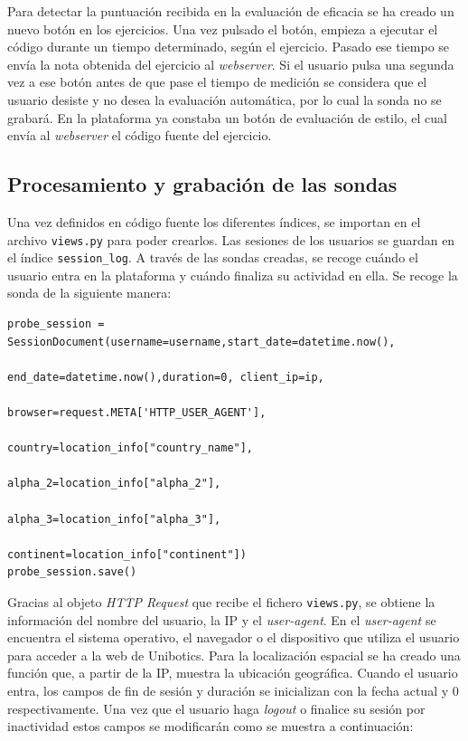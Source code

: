 Para detectar la puntuación recibida en la evaluación de eficacia se ha creado un nuevo botón en los ejercicios. Una vez pulsado el botón, empieza a ejecutar el código durante un tiempo determinado, según el ejercicio. Pasado ese tiempo se envía la nota obtenida del ejercicio al \textit{webserver}. Si el usuario pulsa una segunda vez a ese botón antes de que pase el tiempo de medición se considera que el usuario desiste y no desea la evaluación automática, por lo cual la sonda no se grabará. En la plataforma ya constaba un botón de evaluación de estilo, el cual envía al \textit{webserver} el código fuente del ejercicio.

\subsection{Procesamiento y grabación de las sondas}
Una vez definidos en código fuente los diferentes índices, se importan en el archivo \texttt{views.py} para poder crearlos. Las sesiones de los usuarios se guardan en el índice \texttt{session\_log}. A través de las sondas creadas, se recoge cuándo el usuario entra en la plataforma y cuándo finaliza su actividad en ella. Se recoge la sonda de la siguiente manera:
\\
\begin{lstlisting}
probe_session = SessionDocument(username=username,start_date=datetime.now(),
                                        end_date=datetime.now(),duration=0, client_ip=ip, 
                                        browser=request.META['HTTP_USER_AGENT'],
                                        country=location_info["country_name"],
                                        alpha_2=location_info["alpha_2"], 
                                        alpha_3=location_info["alpha_3"],
                                        continent=location_info["continent"])
probe_session.save()
\end{lstlisting}

Gracias al objeto \textit{HTTP Request} que recibe el fichero \texttt{views.py}, se obtiene la información del nombre del usuario, la IP y el \textit{user-agent}. En el \textit{user-agent} se encuentra el sistema operativo, el navegador o el dispositivo que utiliza el usuario para acceder a la web de Unibotics. Para la localización espacial se ha creado una función que, a partir de la IP, muestra la ubicación geográfica. Cuando el usuario entra, los campos de fin de sesión y duración se inicializan con la fecha actual y 0 respectivamente. Una vez que el usuario haga \textit{logout} o finalice su sesión por inactividad estos campos se modificarán como se muestra a continuación:\\

